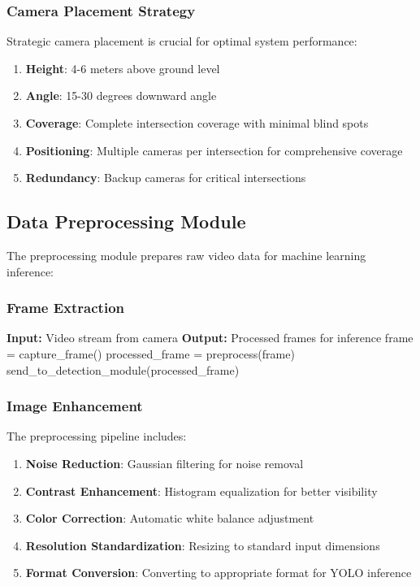 \subsubsection{Camera Placement Strategy}

Strategic camera placement is crucial for optimal system performance:

\begin{enumerate}
    \item \textbf{Height}: 4-6 meters above ground level
    \item \textbf{Angle}: 15-30 degrees downward angle
    \item \textbf{Coverage}: Complete intersection coverage with minimal blind spots
    \item \textbf{Positioning}: Multiple cameras per intersection for comprehensive coverage
    \item \textbf{Redundancy}: Backup cameras for critical intersections
\end{enumerate}

\subsection{Data Preprocessing Module}

The preprocessing module prepares raw video data for machine learning inference:

\subsubsection{Frame Extraction}

\begin{algorithmic}[1]
\STATE \textbf{Input:} Video stream from camera
\STATE \textbf{Output:} Processed frames for inference
\STATE 
{}
    \STATE frame = capture\_frame()
        \STATE processed\_frame = preprocess(frame)
        \STATE send\_to\_detection\_module(processed\_frame)
    \ENDIF
\ENDWHILE
\end{algorithmic}

\subsubsection{Image Enhancement}

The preprocessing pipeline includes:

\begin{enumerate}
    \item \textbf{Noise Reduction}: Gaussian filtering for noise removal
    \item \textbf{Contrast Enhancement}: Histogram equalization for better visibility
    \item \textbf{Color Correction}: Automatic white balance adjustment
    \item \textbf{Resolution Standardization}: Resizing to standard input dimensions
    \item \textbf{Format Conversion}: Converting to appropriate format for YOLO inference
\end{enumerate}

